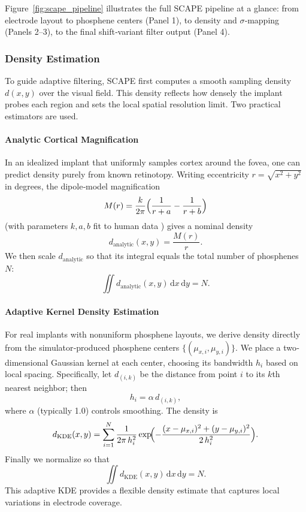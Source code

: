Figure~\ref{fig:scape_pipeline} illustrates the full SCAPE pipeline at a glance: from electrode layout to phosphene centers (Panel 1), to density and $\sigma$‐mapping (Panels 2–3), to the final shift‐variant filter output (Panel 4).  



\subsubsection{Density Estimation}
To guide adaptive filtering, SCAPE first computes a smooth sampling density \(d(x,y)\) over the visual field. This density reflects how densely the implant probes each region and sets the local spatial resolution limit. Two practical estimators are used.

\paragraph{Analytic Cortical Magnification}  
In an idealized implant that uniformly samples cortex around the fovea, one can predict density purely from known retinotopy. Writing eccentricity \(r=\sqrt{x^2+y^2}\) in degrees, the dipole‐model magnification  
\[
M(r)=\frac{k}{2\pi}\Bigl(\frac{1}{r+a}-\frac{1}{r+b}\Bigr)
\]
(with parameters \(k,a,b\) fit to human data \cite{vanderGrinten2024}) gives a nominal density  
\[
d_{\mathrm{analytic}}(x,y)=\frac{M(r)}{r}.
\]
We then scale \(d_{\mathrm{analytic}}\) so that its integral equals the total number of phosphenes \(N\):
\[
\iint d_{\mathrm{analytic}}(x,y)\,\mathrm{d}x\,\mathrm{d}y = N.
\]

\paragraph{Adaptive Kernel Density Estimation}  
For real implants with nonuniform phosphene layouts, we derive density directly from the simulator‐produced phosphene centers \(\{(\mu_{x,i},\mu_{y,i})\}\). We place a two‐dimensional Gaussian kernel at each center, choosing its bandwidth \(h_i\) based on local spacing. Specifically, let \(d_{(i,k)}\) be the distance from point \(i\) to its \(k\)th nearest neighbor; then
\[
h_i = \alpha\,d_{(i,k)},
\]
where \(\alpha\) (typically 1.0) controls smoothing. The density is
\[
d_{\mathrm{KDE}}(x,y)
= \sum_{i=1}^N \frac{1}{2\pi\,h_i^2}
\exp\!\Bigl(-\frac{(x-\mu_{x,i})^2 + (y-\mu_{y,i})^2}{2\,h_i^2}\Bigr).
\]
Finally we normalize so that
\[
\iint d_{\mathrm{KDE}}(x,y)\,\mathrm{d}x\,\mathrm{d}y = N.
\]
This adaptive KDE provides a flexible density estimate that captures local variations in electrode coverage.


